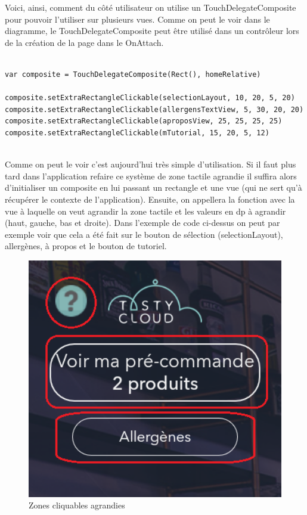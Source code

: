 \clearpage

Voici, ainsi, comment du côté utilisateur on utilise un TouchDelegateComposite pour pouvoir l'utiliser sur plusieurs vues. Comme on peut le voir dans le diagramme, le TouchDelegateComposite peut être utilisé dans un contrôleur lors de la création de la page dans le OnAttach.

\begin{lstlisting}[frame=single]  % Start your code-block
    
var composite = TouchDelegateComposite(Rect(), homeRelative)

composite.setExtraRectangleClickable(selectionLayout, 10, 20, 5, 20)
composite.setExtraRectangleClickable(allergensTextView, 5, 30, 20, 20)
composite.setExtraRectangleClickable(aproposView, 25, 25, 25, 25)
composite.setExtraRectangleClickable(mTutorial, 15, 20, 5, 12)
    
\end{lstlisting}

Comme on peut le voir c'est aujourd'hui très simple d'utilisation. Si il faut plus tard dans l'application refaire ce système de zone tactile agrandie il suffira alors d'initialiser un composite en lui passant un rectangle et une vue (qui ne sert qu'à récupérer le contexte de l'application). Ensuite, on appellera la fonction avec la vue à laquelle on veut agrandir la zone tactile et les valeurs en dp à agrandir (haut, gauche, bas et droite). Dans l'exemple de code ci-dessus on peut par exemple voir que cela a été fait sur le bouton de sélection (selectionLayout), allergènes, à propos et le bouton de tutoriel.

\begin{figure}[!htb]
  \centering
  \includegraphics[width=115mm,scale=0.5]{images/tutoriel_click.png}
  \caption{Zones cliquables agrandies}
  \label{fig:boat1}
\end{figure}

